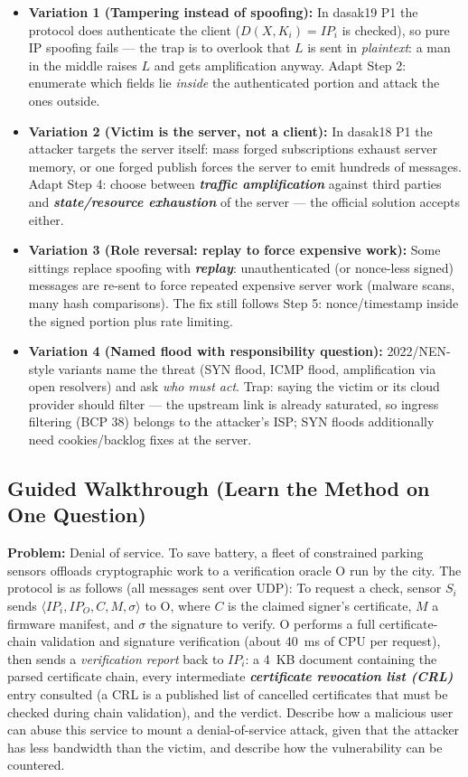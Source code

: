 \documentclass[12pt, a4paper]{article}
\newcommand{\term}[1]{\textbf{\textit{#1}}}        %
\begin{document}
\begin{trapbox}
\begin{itemize}
    \item \textbf{Variation 1 (Tampering instead of spoofing):} In dasak19 P1 the protocol does authenticate the client ($D(X, K_i) = IP_i$ is checked), so pure IP spoofing fails --- the trap is to overlook that $L$ is sent in \emph{plaintext}: a man in the middle raises $L$ and gets amplification anyway. Adapt Step 2: enumerate which fields lie \emph{inside} the authenticated portion and attack the ones outside.
    \item \textbf{Variation 2 (Victim is the server, not a client):} In dasak18 P1 the attacker targets the server itself: mass forged subscriptions exhaust server memory, or one forged publish forces the server to emit hundreds of messages. Adapt Step 4: choose between \term{traffic amplification} against third parties and \term{state/resource exhaustion} of the server --- the official solution accepts either.
    \item \textbf{Variation 3 (Role reversal: replay to force expensive work):} Some sittings replace spoofing with \term{replay}: unauthenticated (or nonce-less signed) messages are re-sent to force repeated expensive server work (malware scans, many hash comparisons). The fix still follows Step 5: nonce/timestamp inside the signed portion plus rate limiting.
    \item \textbf{Variation 4 (Named flood with responsibility question):} 2022/NEN-style variants name the threat (SYN flood, ICMP flood, amplification via open resolvers) and ask \emph{who must act}. Trap: saying the victim or its cloud provider should filter --- the upstream link is already saturated, so ingress filtering (BCP 38) belongs to the attacker's ISP; SYN floods additionally need cookies/backlog fixes at the server.
\end{itemize}
\end{trapbox}

\subsection*{Guided Walkthrough (Learn the Method on One Question)}
\textbf{Problem:} Denial of service. To save battery, a fleet of constrained parking sensors offloads cryptographic work to a verification oracle O run by the city. The protocol is as follows (all messages sent over UDP): To request a check, sensor $S_i$ sends $\langle IP_i, IP_O, C, M, \sigma \rangle$ to O, where $C$ is the claimed signer's certificate, $M$ a firmware manifest, and $\sigma$ the signature to verify. O performs a full certificate-chain validation and signature verification (about 40~ms of CPU per request), then sends a \emph{verification report} back to $IP_i$: a 4~KB document containing the parsed certificate chain, every intermediate \term{certificate revocation list (CRL)} entry consulted (a CRL is a published list of cancelled certificates that must be checked during chain validation), and the verdict. Describe how a malicious user can abuse this service to mount a denial-of-service attack, given that the attacker has less bandwidth than the victim, and describe how the vulnerability can be countered.
\end{document}

